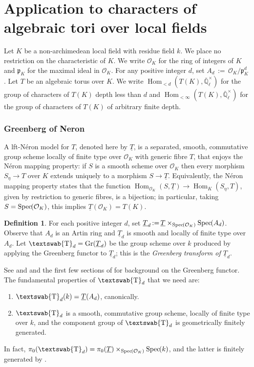 \documentclass[11pt]{amsart}
\makeatletter
\newcommand{\mathswab}[1]{\operatorname{\textswab{#1}}}
\theoremstyle{plain}
\theoremstyle{definition}
\newtheorem{definition}[theorem]{Definition}
\theoremstyle{remark}
\newcommand{\Spec}[1]{{\operatorname{Spec}\hskip-1pt( #1 )}}
\newcommand{\EE}{\mathbb{\bar Q}_\ell}
\newcommand{\OK}{\mathcal{O}_K}
\newcommand{\pK}{\mathfrak{p}_K}
\newcommand{\Fq}{k}
\newcommand{\EEx}{\EE^\times}
\DeclareMathOperator{\Hom}{Hom}
\DeclareMathOperator{\Gr}{Gr}
\newcommand{\ceq}{{\, :=\, }}
\newcommand{\GN}[1]{\mathswab{#1}}
\newcommand{\TT}{\underline{T}}
\newcommand{\labitem}[2]{%
\def\@itemlabel{\textbf{#1}}
\item
\def\@currentlabel{#1}\label{#2}}
\makeatother
\begin{document}
\part{Application to characters of algebraic tori over local fields}

Let $K$ be a non-archimedean local field with residue field $\Fq$.
We place no restriction on the characteristic of $K$. 
We write $\OK$ for the ring of integers of $K$ and $\pK$ for the maximal ideal in $\OK$. 
For any positive integer $d$, set $A_d\ceq \OK/\pK^d$.
Let $T$ be an algebraic torus over $K$.
We write $\Hom_{< d}(T(K),\EEx)$ for the group of characters of $T(K)$ depth less than $d$ 
and $\Hom_{<\infty}(T(K),\EEx)$ for the group of characters of $T(K)$ of arbitrary finite depth.

\section{Greenberg of Neron}
\label{sec:GN}

A lft-N\'eron model for $T$, denoted here by $\TT$, 
is a separated, smooth, commutative group scheme locally of finite type over $\OK$ with generic fibre $T$, that enjoys the N\'eron mapping property: if
$S$ is a smooth scheme over $\OK$ then every morphism $S_\eta \to T$
over $K$ extends uniquely to a morphism $S \to \TT$. Equivalently, the
N\'eron mapping property states that the function
$\Hom_{\OK} (S,\TT) \to \Hom_K(S_\eta,T)$, given by restriction to
generic fibres, is a bijection; 
in particular, taking $S = \Spec{\OK}$, this implies $\TT(\OK) = T(K)$.

\begin{definition}\label{def:GN}
For each positive integer $d$, set $\TT_{d} \ceq \TT \times_\Spec{\OK} \Spec{A_d}$. Observe that $A_d$ is an Artin ring and $\TT_{d}$ is smooth and locally of finite type over $A_d$.
%
Let $\GN{T}_{d} = \Gr(\TT_d)$ be the group scheme over $\Fq$ produced by applying
the Greenberg functor to $\TT_{d}$; this is the \emph{Greenberg transform of $\TT_d$}.
\end{definition}

See \cite{Greenberg:2} and \cite[Ch. 9, \S 6]{BLR} and the first few sections of \cite{Stasinski} for background on the Greenberg functor. The fundamental properties of $\GN{T}_d$ that we need are:
 \begin{enumerate}
   \labitem{(GN.0)}{dFq} $\GN{T}_d(\Fq) = \TT(A_d)$, canonically.
  \labitem{(GN.1)}{GNd} $\GN{T}_d$ is a smooth, commutative group scheme, locally of finite type over $\Fq$, and the component group of $\GN{T}_d$ is geometrically finitely generated.
  \end{enumerate}
In fact, $\pi_0(\GN{T}_d) = \pi_0(\TT) \times_{\Spec{\OK}} \Spec{\Fq}$, and the latter is finitely generated by \cite{Xarles}. 
\end{document}
